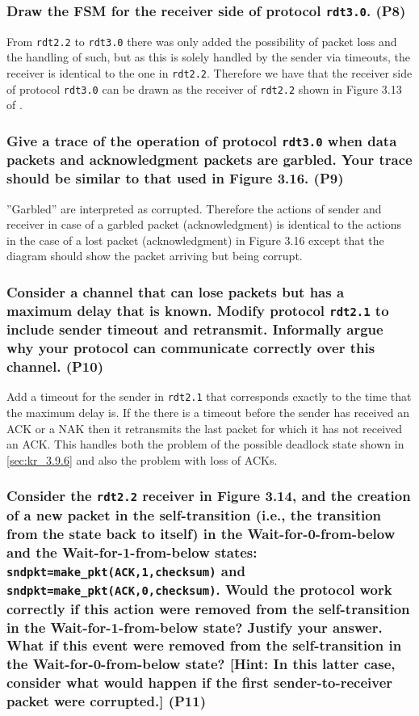 \subsubsection{Draw the FSM for the receiver side of protocol \texttt{rdt3.0}. (P8)}

From \texttt{rdt2.2} to \texttt{rdt3.0} there was only added the possibility of packet loss and the handling of such, but as this is solely handled by the sender via timeouts, the receiver is identical to the one in \texttt{rdt2.2}. Therefore we have that the receiver side of protocol \texttt{rdt3.0} can be drawn as the receiver of \texttt{rdt2.2} shown in Figure 3.13 of \cite{kr}.


\subsubsection{Give a trace of the operation of protocol \texttt{rdt3.0} when data packets and acknowledgment packets are garbled. Your trace should be similar to that used in Figure 3.16. (P9)}

''Garbled'' are interpreted as corrupted. Therefore the actions of sender and receiver in case of a garbled packet (acknowledgment) is identical to the actions in the case of a lost packet (acknowledgment) in Figure 3.16 except that the diagram should show the packet arriving but being corrupt. 


\subsubsection{Consider a channel that can lose packets but has a maximum delay that is known. Modify protocol \texttt{rdt2.1} to include sender timeout and retransmit. Informally argue why your protocol can communicate correctly over this channel. (P10)}

Add a timeout for the sender in \texttt{rdt2.1} that corresponds exactly to the time that the maximum delay is. If the there is a timeout before the sender has received an ACK or a NAK then it retransmits the last packet for which it has not received an ACK. This handles both the problem of the possible deadlock state shown in \ref{sec:kr_3.9.6} and also the problem with loss of ACKs.


\subsubsection{Consider the \texttt{rdt2.2} receiver in Figure 3.14, and the creation of a new packet in the self-transition (i.e., the transition from the state back to itself) in the Wait-for-0-from-below and the Wait-for-1-from-below states: \\ 
\texttt{sndpkt=make\_pkt(ACK,1,checksum)} and \texttt{sndpkt=make\_pkt(ACK,0,checksum)}. Would the protocol work correctly if this action were removed from the self-transition in the Wait-for-1-from-below state? Justify your answer. What if this event were removed from the self-transition in the Wait-for-0-from-below state? [Hint: In this latter case, consider what would happen if the first sender-to-receiver packet were corrupted.] (P11)}

